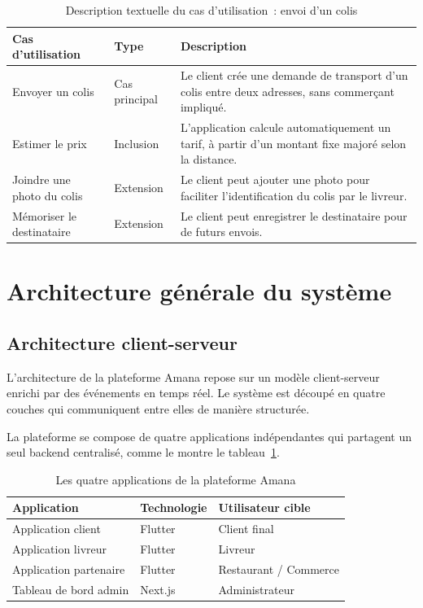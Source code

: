 \documentclass[12pt,fleqn,a4paper]{report}
\begin{document}
\begin{justify}
\begin{table}[H]
\centering
\renewcommand{\arraystretch}{1.4}
\begin{tabular}{|l|l|p{7cm}|}
\hline
\textbf{Cas d'utilisation} & \textbf{Type} & \textbf{Description} \\
\hline
Envoyer un colis & Cas principal &
Le client crée une demande de transport d'un colis entre deux adresses, sans commerçant impliqué. \\
\hline
Estimer le prix & Inclusion &
L'application calcule automatiquement un tarif, à partir d'un montant fixe majoré selon la distance. \\
\hline
Joindre une photo du colis & Extension &
Le client peut ajouter une photo pour faciliter l'identification du colis par le livreur. \\
\hline
Mémoriser le destinataire & Extension &
Le client peut enregistrer le destinataire pour de futurs envois. \\
\hline
\end{tabular}
\caption{Description textuelle du cas d'utilisation~: envoi d'un colis}
\end{table}

\section{Architecture générale du système}

\subsection{Architecture client-serveur}

L'architecture de la plateforme Amana repose sur un modèle client-serveur enrichi par des événements en temps réel. Le système est découpé en quatre couches qui communiquent entre elles de manière structurée.

La plateforme se compose de quatre applications indépendantes qui partagent un seul backend centralisé, comme le montre le tableau~\ref{tab:quatre_apps}.

\begin{table}[H]
\centering
\renewcommand{\arraystretch}{1.4}
\begin{tabular}{|l|l|l|}
\hline
\textbf{Application} & \textbf{Technologie} & \textbf{Utilisateur cible} \\
\hline
Application client & Flutter & Client final \\
\hline
Application livreur & Flutter & Livreur \\
\hline
Application partenaire & Flutter & Restaurant / Commerce \\
\hline
Tableau de bord admin & Next.js & Administrateur \\
\hline
\end{tabular}
\caption{Les quatre applications de la plateforme Amana}
\label{tab:quatre_apps}
\end{table}


\end{justify}
\end{document}
